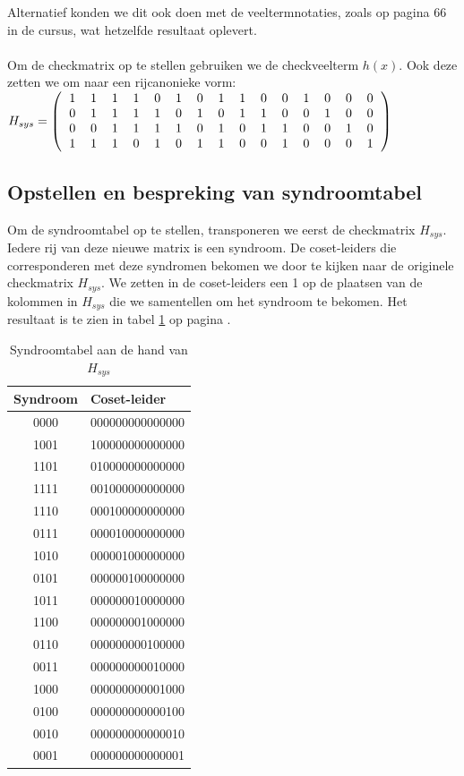 \documentclass[11pt,a4paper]{article}
\begin{document}
Alternatief konden we dit ook doen met de veeltermnotaties, zoals op pagina 66 in de cursus, wat hetzelfde resultaat oplevert. \\\\
Om de checkmatrix op te stellen gebruiken we de checkveelterm $h(x)$. Ook deze zetten we om naar een rijcanonieke vorm:\\

$H_{sys} =\left(
\begin{tabular}{ccccccccccccccc}
1 & 1 & 1 & 1 & 0 & 1 & 0 & 1 & 1 & 0 & 0 & 1 & 0 & 0 & 0\\
0 & 1 & 1 & 1 & 1 & 0 & 1 & 0 & 1 & 1 & 0 & 0 & 1 & 0 & 0\\
0 & 0 & 1 & 1 & 1 & 1 & 0 & 1 & 0 & 1 & 1 & 0 & 0 & 1 & 0\\
1 & 1 & 1 & 0 & 1 & 0 & 1 & 1 & 0 & 0 & 1 & 0 & 0 & 0 & 1
\end{tabular}
\right)$\\


\subsection{Opstellen en bespreking van syndroomtabel}

Om de syndroomtabel op te stellen, transponeren we eerst de checkmatrix $H_{sys}$. Iedere rij van deze nieuwe matrix is een syndroom. De coset-leiders die corresponderen met deze syndromen bekomen we door te kijken naar de originele checkmatrix $H_{sys}$. We zetten in de coset-leiders een 1 op de plaatsen van de kolommen in $H_{sys}$ die we samentellen om het syndroom te bekomen. Het resultaat is te zien in tabel \ref{tab:1.5} op pagina \pageref{tab:1.5}.

\begin{table}
\centering
\begin{tabular}{c|l}
Syndroom & Coset-leider\\
\hline
0000	&	000000000000000\\
1001	&	100000000000000\\
1101	&	010000000000000\\
1111	&	001000000000000\\
1110	&	000100000000000\\
0111	&	000010000000000\\
1010	&	000001000000000\\
0101	&	000000100000000\\
1011	&	000000010000000\\
1100	&	000000001000000\\
0110	&	000000000100000\\
0011	&	000000000010000\\
1000	&	000000000001000\\
0100	&	000000000000100\\
0010	&	000000000000010\\
0001	&	000000000000001
\end{tabular} 
\caption{Syndroomtabel aan de hand van $H_{sys}$}
\label{tab:1.5}
\end{table}
\end{document}
